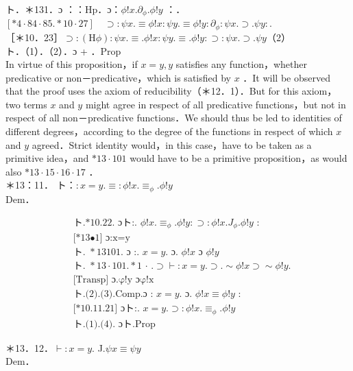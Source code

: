 \documentclass[10pt]{article}
\begin{document}
ト．＊131．ɔ ：：Hp．ɔ：$\phi!x . \partial_{\phi} . \phi!y$ ：．\\
$[* 4 \cdot 84 \cdot 85 . * 10 \cdot 27] \quad \supset: \psi x . \equiv \phi!x: \psi y . \equiv \phi!y: \partial_{\phi}: \psi x . \supset . \psi y:$.\\
［＊10．23］$\supset:(\mathrm{H} \phi): \psi x . \equiv . \phi!x: \psi y . \equiv . \phi!y: \supset: \psi x . \supset . \psi y$（2）\\
ト．（1）．（2）．ɔ + ．Prop\\
In virtue of this proposition，if $x=y, y$ satisfies any function，whether predicative or non－predicative，which is satisfied by $x$ ．It will be observed that the proof uses the axiom of reducibility（＊12．1）．But for this axiom，two terms $x$ and $y$ might agree in respect of all predicative functions，but not in respect of all non－predicative functions．We should thus be led to identities of different degrees，according to the degree of the functions in respect of which $x$ and $y$ agreed．Strict identity would，in this case，have to be taken as a primitive idea，and $* 13 \cdot 101$ would have to be a primitive proposition，as would also $* 13 \cdot 15 \cdot 16 \cdot 17$ ．\\
＊13：11． ト：$: x=y . \equiv: \phi!x . \equiv_{\phi} . \phi!y$\\
Dem．


\begin{align*}
& \text { ト.*10.22. ɔト:. } \phi!x . \equiv_{\phi} . \phi!y: \supset: \phi!x . J_{\phi} . \phi!y \text { : } \\
& \text { [*13•1] ɔ:x=y }  \tag{1}\\
& \text { ト. } * 13101 \text {. ɔ :. } x=y . \text { ɔ. } \phi!x \text { ɔ } \phi!y  \tag{2}\\
& \text { ト. } * 13 \cdot 101 . * 1 \text { ⋅ } . \supset \vdash: x=y . \supset . \sim \phi!x \supset \sim \phi!y \text {. } \\
& \text { [Transp] ɔ.φ!y ɔφ!x }  \tag{3}\\
& \text { ト.(2).(3).Comp.ɔ : } x=y \text {. ɔ. } \phi!x \equiv \phi!y \text { : } \\
& \text { [*10.11.21] ɔト:. } x=y . \supset: \phi!x . \equiv_{\phi} . \phi!y  \tag{4}\\
& \text { ト.(1).(4). ɔト.Prop }
\end{align*}


＊13．12．$\vdash: x=y$. J.$\psi x \equiv \psi y$\\
Dem．
\end{document}
